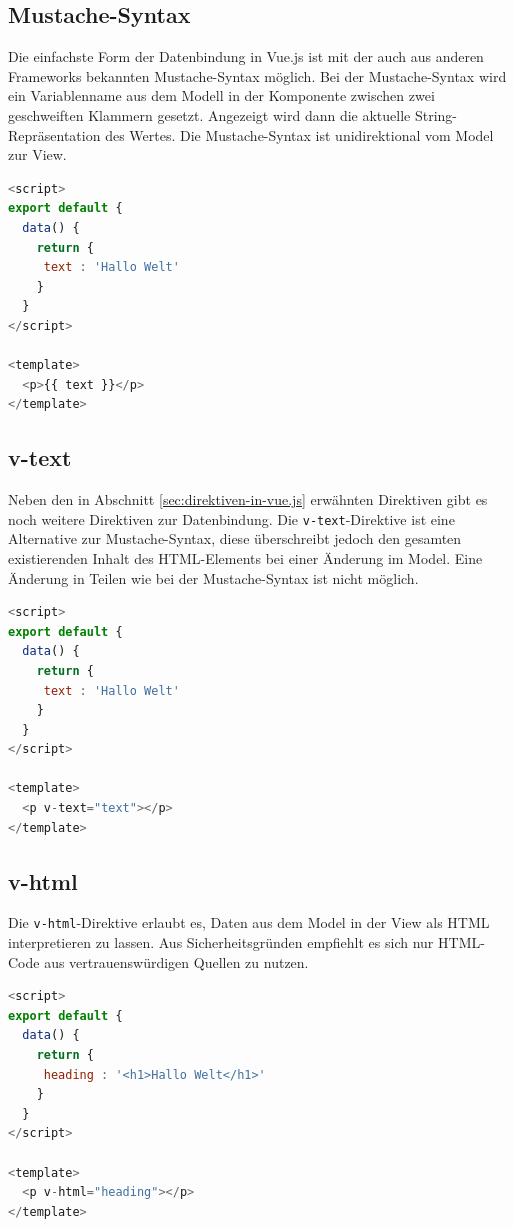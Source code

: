 \subsection*{Mustache-Syntax}
Die einfachste Form der Datenbindung in Vue.js ist mit der auch aus anderen Frameworks bekannten Mustache-Syntax möglich.
Bei der Mustache-Syntax wird ein Variablenname aus dem Modell in der Komponente zwischen zwei geschweiften Klammern gesetzt.
Angezeigt wird dann die aktuelle String-Repräsentation des Wertes.
Die Mustache-Syntax ist unidirektional vom Model zur View. \cite{vueTemplateSyntax}
\begin{lstlisting}[caption={Mustache-Syntax},language=javascript, label={lst:Mustache-Syntax}]
<script>
export default {
  data() {
    return {
     text : 'Hallo Welt'
    }
  }
</script>

<template>
  <p>{{ text }}</p>
</template>
\end{lstlisting}

\subsection*{v-text}
Neben den in Abschnitt \ref{sec:direktiven-in-vue.js}
erwähnten Direktiven gibt es noch weitere Direktiven zur Datenbindung.
Die \texttt{v-text}-Direktive ist eine Alternative zur Mustache-Syntax,
diese überschreibt jedoch den gesamten existierenden Inhalt des HTML-Elements bei einer Änderung im Model.
Eine Änderung in Teilen wie bei der Mustache-Syntax ist nicht möglich. \cite{vueDirectives}
\begin{lstlisting}[caption={\texttt{v-text}-Direktive},language=javascript, label={lst:v-text-Direktive}]
<script>
export default {
  data() {
    return {
     text : 'Hallo Welt'
    }
  }
</script>

<template>
  <p v-text="text"></p>
</template>
\end{lstlisting}

\subsection*{v-html}
Die \texttt{v-html}-Direktive erlaubt es, Daten aus dem Model in der View als HTML interpretieren zu lassen.
Aus Sicherheitsgründen empfiehlt es sich nur HTML-Code aus vertrauenswürdigen Quellen zu nutzen. \cite{vueTemplateSyntax}
\begin{lstlisting}[caption={\texttt{v-html}-Direktive},language=javascript, label={lst:v-html-Direktive}]
<script>
export default {
  data() {
    return {
     heading : '<h1>Hallo Welt</h1>'
    }
  }
</script>

<template>
  <p v-html="heading"></p>
</template>
\end{lstlisting}

